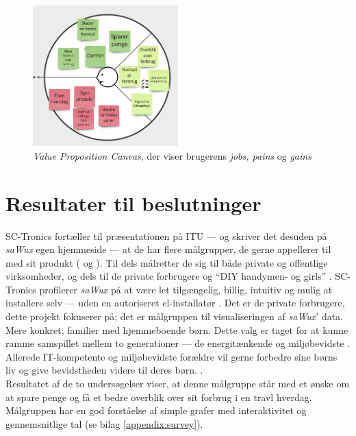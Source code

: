 \begin{figure}[H]
    \centering
    \includegraphics[width=0.5\textwidth]{Images/Value Proposition Design.png}
    \caption[\emph{Value Proposition Canvas}]{\emph{Value Proposition Canvas}, der viser brugerens \emph{jobs, pains} og \emph{gains}}
    \label{img:problem:canvas}
\end{figure}

\section{Resultater til beslutninger}
SC-Tronics fortæller til præsentationen på ITU — og skriver det desuden på \emph{saWux} egen hjemmeside — at de har flere målgrupper, de gerne appellerer til med sit produkt (\cite{virksomhedspresentation} og \cite{sawux}).
Til dels målretter de sig til både private og offentlige virksomheder, og dels til de private forbrugere og “DIY handymen- og girls” \cite{sawux}. SC-Tronics profilerer \emph{saWux} på at være let tilgængelig, billig, intuitiv og mulig at installere selv — uden en autoriseret el-installatør \citep{virksomhedspresentation}. Det er de private forbrugere, dette projekt fokuserer på; det er målgruppen til visualiseringen af \emph{saWux}' data. Mere konkret; familier med hjemmeboende børn. Dette valg er taget for at kunne ramme samspillet mellem to generationer — de energitænkende og  miljøbevidste \citep{energiwatch}. Allerede IT-kompetente og miljøbevidste forældre vil gerne forbedre sine børns liv og give bevidstheden videre til deres børn. \citep{stacey}.\\

Resultatet af de to undersøgelser viser, at denne målgruppe står med et ønske om at spare penge og få et bedre overblik over sit forbrug i en travl hverdag. Målgruppen har en god forståelse af simple grafer med interaktivitet og gennemsnitlige tal (se bilag \ref{appendix:survey}).